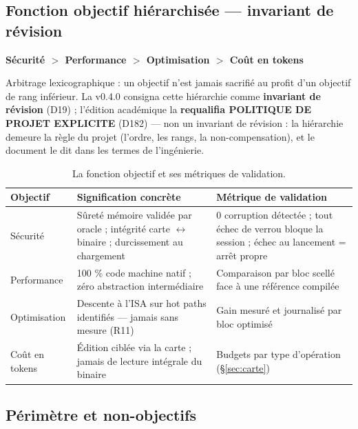 \subsection{Fonction objectif hiérarchisée — invariant de révision}\label{sec:objectif}

\begin{center}
\large\bfseries Sécurité $>$ Performance $>$ Optimisation $>$ Coût en tokens
\end{center}

\medskip

Arbitrage lexicographique : un objectif n’est jamais sacrifié au profit d’un objectif de
rang inférieur. La v0.4.0 consigna cette hiérarchie comme \textbf{invariant de révision}
(D19) ; l’édition académique la \textbf{requalifia POLITIQUE DE PROJET EXPLICITE}
(D182) — non un invariant de révision : la hiérarchie demeure la règle du projet
(l’ordre, les rangs, la non-compensation), et le document le dit dans les termes de
l’ingénierie.

\begin{table}[htbp]
\centering\small
\caption{La fonction objectif et ses métriques de validation.}
\label{tab:objectif}
\begin{tabularx}{\textwidth}{@{}l Y Y@{}}
\toprule
\textbf{Objectif} & \textbf{Signification concrète} & \textbf{Métrique de validation} \\
\midrule
Sécurité & Sûreté mémoire validée par oracle ; intégrité carte $\leftrightarrow$ binaire ;
durcissement au chargement & 0 corruption détectée ; tout échec de verrou bloque la
session ; échec au lancement = arrêt propre \\
Performance & 100 \% code machine natif ; zéro abstraction intermédiaire &
Comparaison par bloc scellé face à une référence compilée \\
Optimisation & Descente à l’ISA sur hot paths identifiés — jamais sans mesure (R11) &
Gain mesuré et journalisé par bloc optimisé \\
Coût en tokens & Édition ciblée via la carte ; jamais de lecture intégrale du binaire &
Budgets par type d’opération (§\ref{sec:carte}) \\
\bottomrule
\end{tabularx}
\end{table}

\subsection{Périmètre et non-objectifs}\label{sec:perimetre}

